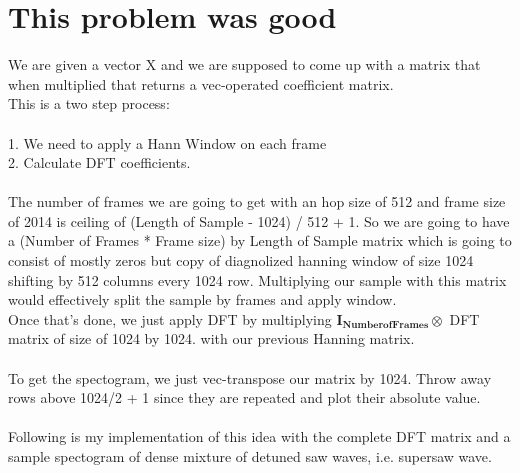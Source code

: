 \documentclass{article}
\newcommand{\matr}[1]{\mathbf{#1}}
\begin{document}
\section{This problem was good}
	We are given a vector X and we are supposed to come up with a matrix that when multiplied that returns a vec-operated coefficient matrix.\\
	This is a two step process:\\
	\\
	1. We need to apply a Hann Window on each frame\\
	2. Calculate DFT coefficients.\\
	\\
	The number of frames we are going to get with an hop size of 512 and frame size of 2014 is ceiling of (Length of Sample - 1024) / 512 + 1.
	So we are going to have a (Number of Frames * Frame size) by Length of Sample matrix which is going to consist of mostly zeros but copy of 				diagnolized hanning window of size 1024 shifting by 512 columns every 1024 row. Multiplying our sample with this matrix would effectively split the 			sample by frames and apply window.
	\\
	Once that's done, we just apply DFT by multiplying $\matr{I_{Number of Frames}} \otimes$  DFT matrix of size of 1024 by 1024. with our previous 			Hanning matrix.\\
	\\
	To get the spectogram, we just vec-transpose our matrix by 1024. Throw away rows above 1024/2 + 1 since they are repeated and plot their absolute 		value.\\
	\\
	Following is my implementation of this idea with the complete DFT matrix and a sample spectogram of dense mixture of detuned saw waves, i.e. 			supersaw wave.

	
\end{document}
